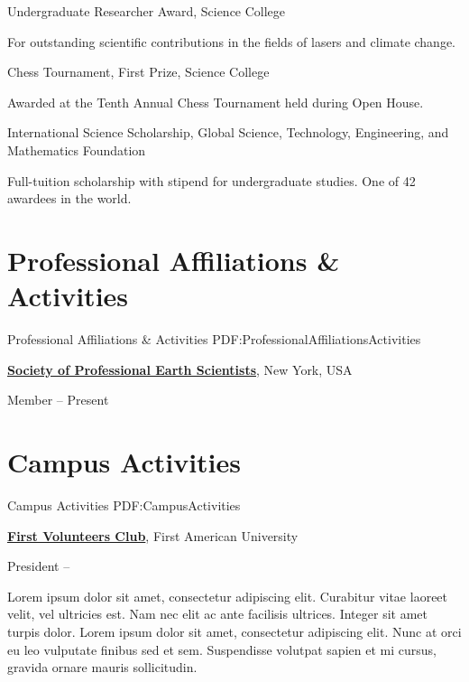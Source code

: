 \documentclass[letterpaper,MMMyyyy,nonstop]{simpleresumecv}
\begin{document}
\begin{body}
\Gap
\BulletItem
Undergraduate Researcher Award,
Science College
\hfill
{}
\begin{detail}
\SubItem
For outstanding scientific contributions in the fields of lasers and climate change.
\end{detail}

\Gap
\BulletItem
Chess Tournament,
First Prize,
Science College
\hfill
{}
\begin{detail}
\SubItem
Awarded at the Tenth Annual Chess Tournament held during Open House.
\end{detail}

\Gap
\BulletItem
International Science Scholarship,
\hfill
{}
\newline
Global Science, Technology, Engineering, and Mathematics Foundation
\begin{detail}
\SubItem
Full-tuition scholarship with stipend for undergraduate studies.
One of 42 awardees in the world.
\end{detail}


\section
{Professional Affiliations\newline
\& Activities}
{Professional Affiliations \& Activities}
{PDF:ProfessionalAffiliationsActivities}

\href{http://www.example.com/my-society}
{\textbf{Society of Professional Earth Scientists}},
New York, USA

\GapNoBreak
\BulletItem
Member
\hfill
{} --
Present


\section
{Campus Activities}
{Campus Activities}
{PDF:CampusActivities}

\href{http://www.example.com/my-club}
{\textbf{First Volunteers Club}},
First American University

\GapNoBreak
\BulletItem
President
\hfill
{} --
\begin{detail}
\SubBulletItem
Lorem ipsum dolor sit amet, consectetur adipiscing elit.
\SubBulletItem
Curabitur vitae laoreet velit, vel ultricies est. Nam nec elit ac ante facilisis ultrices.
\SubBulletItem
Integer sit amet turpis dolor. Lorem ipsum dolor sit amet, consectetur adipiscing elit. Nunc at orci eu leo vulputate finibus sed et sem.
\SubBulletItem
Suspendisse volutpat sapien et mi cursus, gravida ornare mauris sollicitudin.
\end{detail}


\end{body}
\end{document}

